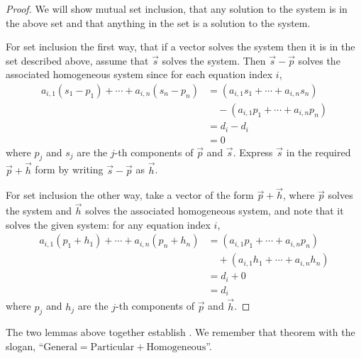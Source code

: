 \begin{proof}
We will show mutual set inclusion, that any solution to the system is in
the above set and that anything in the set is a solution to the 
system.

For set inclusion the first way, that if a vector solves the system
then it is in the set described above, 
assume that \( \vec{s} \) solves the system.
Then \( \vec{s}-\vec{p} \) solves the associated
homogeneous system since for each equation index \( i \),
\begin{equation*}
  \begin{split}
  a_{i,1}(s_1-p_1)+\cdots+a_{i,n}(s_n-p_n)
  &=(a_{i,1}s_1+\cdots+a_{i,n}s_n)       \\
  &\quad -(a_{i,1}p_1+\cdots+a_{i,n}p_n)  \\
  &=d_i-d_i                 \\
  &=0
  \end{split}
\end{equation*}
where \( p_j \) and \( s_j \) are the \( j \)-th components of
\( \vec{p} \) and \( \vec{s} \).
Express \( \vec{s} \) in the required \( \vec{p}+\vec{h} \) form
by writing \( \vec{s}-\vec{p} \) as \( \vec{h} \).

For set inclusion the other way, take a vector of the form $\vec{p}+\vec{h}$,
where \( \vec{p} \) solves the system and \( \vec{h} \) solves the
associated homogeneous system, and note that it solves the given system:
for any equation index $i$, 
\begin{equation*}
  \begin{split}
  a_{i,1}(p_1+h_1)+\cdots+a_{i,n}(p_n+h_n)
  &=(a_{i,1}p_1+\cdots+a_{i,n}p_n)      \\
  &\quad+(a_{i,1}h_1+\cdots+a_{i,n}h_n)  \\
  &=d_i+0                                \\
  &=d_i
  \end{split}
\end{equation*}
where \( p_j \) and \( h_j \) are the \( j \)-th components of 
\( \vec{p} \) and \( \vec{h} \).
\end{proof}

The two lemmas above together establish .
We remember that theorem with the slogan, 
``\( \text{General} = \text{Particular} + \text{Homogeneous} \)''.

